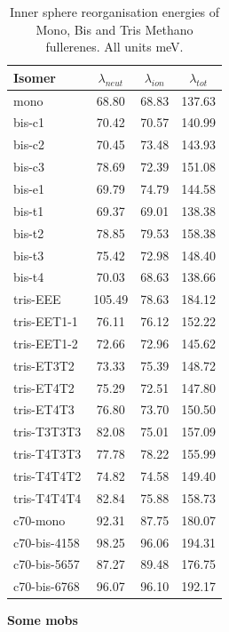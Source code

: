 \documentclass[journal=nanofd,manuscript=suppinfo]{achemso}
\begin{document}
\begin{table}
\centering
\begin{tabular}{lSSS}
\toprule
Isomer & $\lambda_{neut}$ & $\lambda_{ion}$ & $\lambda_{tot}$ \\
\midrule
mono & 68.80 & 68.83 & 137.63 \\
\midrule
bis-c1 & 70.42 & 70.57 & 140.99 \\
bis-c2 & 70.45 & 73.48 & 143.93 \\
bis-c3 & 78.69 & 72.39 & 151.08 \\
bis-e1 & 69.79 & 74.79 & 144.58 \\
bis-t1 & 69.37 & 69.01 & 138.38 \\
bis-t2 & 78.85 & 79.53 & 158.38 \\
bis-t3 & 75.42 & 72.98 & 148.40 \\
bis-t4 & 70.03 & 68.63 & 138.66 \\
\midrule
tris-EEE & 105.49 & 78.63 & 184.12 \\
tris-EET1-1 & 76.11 & 76.12 & 152.22 \\
tris-EET1-2 & 72.66 & 72.96 & 145.62 \\
tris-ET3T2 & 73.33 & 75.39 & 148.72 \\
tris-ET4T2 & 75.29 & 72.51 & 147.80 \\
tris-ET4T3 & 76.80 & 73.70 & 150.50 \\
tris-T3T3T3 & 82.08 & 75.01 & 157.09 \\
tris-T4T3T3 & 77.78 & 78.22 & 155.99 \\
tris-T4T4T2 & 74.82 & 74.58 & 149.40 \\
tris-T4T4T4 & 82.84 & 75.88 & 158.73 \\
\midrule
c70-mono & 92.31 & 87.75 & 180.07 \\
c70-bis-4158 & 98.25 & 96.06 & 194.31 \\
c70-bis-5657 & 87.27 & 89.48 & 176.75 \\
c70-bis-6768 & 96.07 & 96.10 & 192.17 \\
\bottomrule
\end{tabular}
\caption{\label{tab:Lambda}
Inner sphere reorganisation energies of Mono, Bis and Tris Methano fullerenes. All units meV.}
\end{table}


\textbf{Some mobs}
\end{document}
